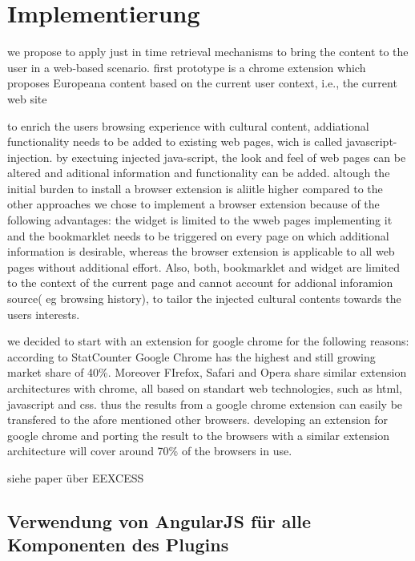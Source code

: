 \section{Implementierung}
we propose to apply just in time retrieval mechanisms to bring the content to the user in a web-based scenario.
 	first prototype is a chrome extension which proposes Europeana content based on the current user context, i.e., the current web site

 	to enrich the users browsing experience with cultural content, addiational functionality needs to be added to existing web pages, wich is called javascript-injection. by exectuing injected java-script, the look and feel of web pages can be altered and aditional information and functionality can be added.
 	altough the initial burden to install a browser extension is aliitle higher compared to the other approaches we chose to implement a browser extension because of the following advantages: the widget is limited to the wweb pages implementing it and the bookmarklet needs to be triggered on every page on which additional information is desirable, whereas the browser extension is applicable to all web pages without additional effort. Also, both, bookmarklet and widget are limited to the context of the current page and cannot account for addional inforamion source( eg browsing history), to tailor the injected cultural contents towards the users interests.

 	we decided to start with an extension for google chrome for the following reasons: according to StatCounter Google Chrome has the highest and still growing market share of 40\%. Moreover FIrefox, Safari and Opera share similar extension architectures with chrome, all based on standart web technologies, such as html, javascript and css. thus the results from a google chrome extension can easily be transfered to the afore mentioned other browsers. developing an extension for google chrome and porting the result to the browsers with a similar extension architecture will cover around 70\% of the browsers in use.

 	siehe paper über EEXCESS
 \subsection{Verwendung von AngularJS für alle Komponenten des Plugins}

